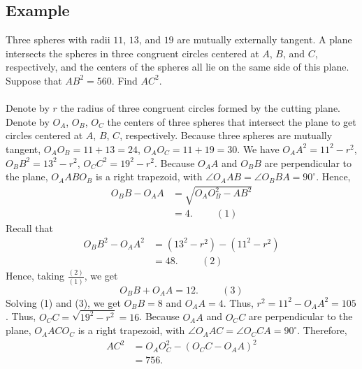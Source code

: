 \documentclass{article}
\begin{document}
\subsection{Example}
Three spheres with radii $11$, $13$, and $19$ are mutually externally tangent. A plane intersects the spheres in three congruent circles centered at $A$, $B$, and $C$, respectively, and the centers of the spheres all lie on the same side of this plane. Suppose that $AB^2 = 560$. Find $AC^2$.\\
\\
Denote by $r$ the radius of three congruent circles formed by the cutting plane. Denote by $O_A$, $O_B$, $O_C$ the centers of three spheres that intersect the plane to get circles centered at $A$, $B$, $C$, respectively.
Because three spheres are mutually tangent, $O_A O_B = 11 + 13 = 24$, $O_A O_C = 11 + 19 = 30$.
We have $O_A A^2 = 11^2 - r^2$, $O_B B^2 = 13^2 - r^2$, $O_C C^2 = 19^2 - r^2$.
Because $O_A A$ and $O_B B$ are perpendicular to the plane, $O_A AB O_B$ is a right trapezoid, with $\angle O_A A B = \angle O_B BA = 90^\circ$.
Hence,\begin{align*} O_B B - O_A A & = \sqrt{O_A O_B^2 - AB^2} \\ & = 4 . \hspace{1cm} (1) \end{align*}
Recall that\begin{align*} O_B B^2 - O_A A^2 & = \left( 13^2 - r^2 \right) - \left( 11^2 - r^2 \right) \\ & = 48 . \hspace{1cm} (2) \end{align*}
Hence, taking $\frac{(2)}{(1)}$, we get\[ O_B B + O_A A = 12 . \hspace{1cm} (3) \]
Solving (1) and (3), we get $O_B B = 8$ and $O_A A = 4$.
Thus, $r^2 = 11^2 - O_A A^2 = 105$.
Thus, $O_C C = \sqrt{19^2 - r^2} = 16$.
Because $O_A A$ and $O_C C$ are perpendicular to the plane, $O_A AC O_C$ is a right trapezoid, with $\angle O_A A C = \angle O_C CA = 90^\circ$.
Therefore,\begin{align*} AC^2 & = O_A O_C^2 - \left( O_C C - O_A A \right)^2 \\ & = \boxed{756}. \end{align*}
\end{document}
